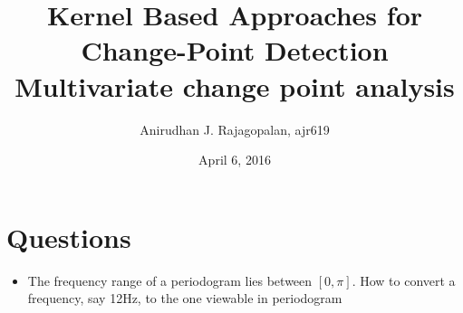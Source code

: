 \documentclass{article}
\begin{document}
\title{Kernel Based Approaches for Change-Point Detection\\ Multivariate change point analysis}
\date{April 6, 2016}
\author{Anirudhan J. Rajagopalan, ajr619}

\maketitle

\newpage

\section{Questions}
\begin{itemize}
  \item The frequency range of a periodogram lies between $[0, \pi]$.  How to convert a frequency, say 12Hz, to the one viewable in periodogram 
\end{itemize}
\end{document}
